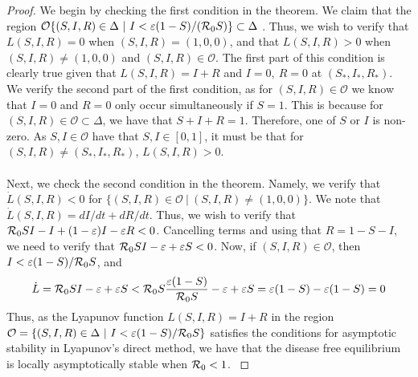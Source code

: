 \documentclass[12pt]{article}\usepackage[]{graphicx}\usepackage[]{color}
\begin{document}
\begin{enumerate}[(a)]
{\begin{proof}
{We begin by checking the first condition in the theorem. We claim that the region  $\mathcal{O} \{(S,I,R) \in \Delta \ | \ I< \varepsilon(1-S)/({\cal R}_0S)\} \subset \Delta$ . Thus, we wish to verify that $L(S,I,R)=0$ when $(S,I,R)=(1,0,0)$, and that $L(S,I,R)>0$ when $(S,I,R) \neq (1,0,0)$ and $(S,I,R) \in \mathcal{O}$. The first part of this condition is clearly true given that $L(S,I,R)=I+R$ and $I=0,\ R=0$ at $(S_\ast, I_\ast, R_\ast)$. We verify the second part of the first condition, as for $(S,I,R) \in \mathcal{O}$ we know that $I=0$ and $R=0$ only occur simultaneously if $S=1$. This is because for $(S,I,R) \in \mathcal{O} \subset \Delta$, we have that $S+I+R=1$. Therefore, one of $S$ or $I$ is non-zero. As $S,I \in \mathcal{O}$ have that $S,I \in [0,1]$, it must be that for $(S,I,R) \neq (S_\ast, I_\ast, R_\ast)$, $L(S,I,R)>0$. \\
\\
Next, we check the second condition in the theorem. Namely, we verify that $\dot{L}(S,I,R) <0$ for $\{ (S,I,R) \in \mathcal{O} \ | \ (S,I,R) \neq (1,0,0)\}$. We note that $\dot{L}(S,I,R) = dI/dt + dR/dt$. Thus, we wish to verify that ${\cal R}_0 SI - I + (1-\varepsilon) I - \varepsilon R <0$. Cancelling terms and using that $R=1-S-I$, we need to verify that ${\cal R}_0 SI - \varepsilon + \varepsilon S <0$. Now, if  $(S, I, R) \in \mathcal{O}$, then $I<\varepsilon(1-S)/{\cal R}_0S$, and 
$$
\dot L = {\cal R}_0 SI - \varepsilon + \varepsilon S < {\cal R}_0 S \frac{\varepsilon(1-S)}{{\cal R}_0 S}- \varepsilon + \varepsilon S = \varepsilon(1-S) - \varepsilon(1-S) = 0
$$
Thus, as the Lyapunov function $L(S,I,R)=I+R$ in the region $\mathcal{O}=\{(S,I,R) \in \Delta \ | \ I< \varepsilon(1-S)/{\cal R}_0S\}$ satisfies the conditions for asymptotic stability in Lyapunov's direct method, we have that the disease free equilibrium is locally asymptotically stable when ${\cal R}_0<1$.
}\end{proof}}


\end{enumerate}
\end{document}
